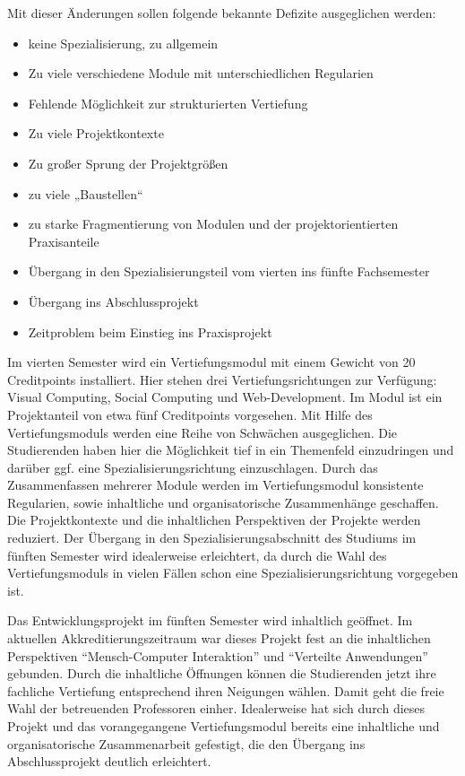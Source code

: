 Mit dieser Änderungen sollen folgende bekannte Defizite ausgeglichen
werden:

\begin{itemize}
\tightlist
\item
  keine Spezialisierung, zu allgemein
\item
  Zu viele verschiedene Module mit unterschiedlichen Regularien
\item
  Fehlende Möglichkeit zur strukturierten Vertiefung
\item
  Zu viele Projektkontexte
\item
  Zu großer Sprung der Projektgrößen
\item
  zu viele „Baustellen``
\item
  zu starke Fragmentierung von Modulen und der projektorientierten
  Praxisanteile
\item
  Übergang in den Spezialisierungsteil vom vierten ins fünfte
  Fachsemester
\item
  Übergang ins Abschlussprojekt
\item
  Zeitproblem beim Einstieg ins Praxisprojekt
\end{itemize}

Im vierten Semester wird ein Vertiefungsmodul mit einem Gewicht von 20
Creditpoints installiert. Hier stehen drei Vertiefungsrichtungen zur
Verfügung: Visual Computing, Social Computing und Web-Development. Im
Modul ist ein Projektanteil von etwa fünf Creditpoints vorgesehen. Mit
Hilfe des Vertiefungsmoduls werden eine Reihe von Schwächen
ausgeglichen. Die Studierenden haben hier die Möglichkeit tief in ein
Themenfeld einzudringen und darüber ggf. eine Spezialisierungsrichtung
einzuschlagen. Durch das Zusammenfassen mehrerer Module werden im
Vertiefungsmodul konsistente Regularien, sowie inhaltliche und
organisatorische Zusammenhänge geschaffen. Die Projektkontexte und die
inhaltlichen Perspektiven der Projekte werden reduziert. Der Übergang in
den Spezialisierungsabschnitt des Studiums im fünften Semester wird
idealerweise erleichtert, da durch die Wahl des Vertiefungsmoduls in
vielen Fällen schon eine Spezialisierungsrichtung vorgegeben ist.

Das Entwicklungsprojekt im fünften Semester wird inhaltlich geöffnet. Im
aktuellen Akkreditierungszeitraum war dieses Projekt fest an die
inhaltlichen Perspektiven ``Mensch-Computer Interaktion'' und
``Verteilte Anwendungen'' gebunden. Durch die inhaltliche Öffnungen
können die Studierenden jetzt ihre fachliche Vertiefung entsprechend
ihren Neigungen wählen. Damit geht die freie Wahl der betreuenden
Professoren einher. Idealerweise hat sich durch dieses Projekt und das
vorangegangene Vertiefungsmodul bereits eine inhaltliche und
organisatorische Zusammenarbeit gefestigt, die den Übergang ins
Abschlussprojekt deutlich erleichtert.

